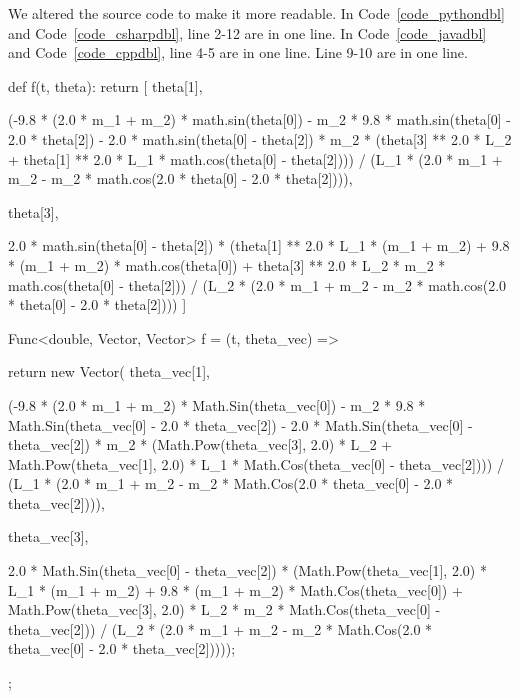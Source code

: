 We altered the source code to make it more readable. In Code~\ref{code_pythondbl} and Code~\ref{code_csharpdbl}, line 2-12 are in one line. In Code~\ref{code_javadbl} and Code~\ref{code_cppdbl}, line 4-5 are in one line. Line 9-10 are in one line.
\begin{listing}[ht]
\begin{python1}
def f(t, theta):
	return [
		theta[1],

		(-9.8 * (2.0 * m_1 + m_2) * math.sin(theta[0]) - m_2 * 9.8 * math.sin(theta[0] - 2.0 * theta[2]) - 2.0 * math.sin(theta[0] - theta[2]) * m_2 * (theta[3] ** 2.0 * L_2 + theta[1] ** 2.0 * L_1 * math.cos(theta[0] - theta[2]))) 
			/ (L_1 * (2.0 * m_1 + m_2 - m_2 * math.cos(2.0 * theta[0] - 2.0 * theta[2]))), 
		
		theta[3], 
		
		2.0 * math.sin(theta[0] - theta[2]) * (theta[1] ** 2.0 * L_1 * (m_1 + m_2) + 9.8 * (m_1 + m_2) * math.cos(theta[0]) + theta[3] ** 2.0 * L_2 * m_2 * math.cos(theta[0] - theta[2])) 
			/ (L_2 * (2.0 * m_1 + m_2 - m_2 * math.cos(2.0 * theta[0] - 2.0 * theta[2])))
		]
\end{python1}
\label{code_pythondbl}
\end{listing} 

\begin{listing}[ht]
\begin{csharp1}
Func<double, Vector, Vector> f = (t, theta_vec) => {
	return new Vector(
		theta_vec[1], 

		(-9.8 * (2.0 * m_1 + m_2) * Math.Sin(theta_vec[0]) - m_2 * 9.8 * Math.Sin(theta_vec[0] - 2.0 * theta_vec[2]) - 2.0 * Math.Sin(theta_vec[0] - theta_vec[2]) * m_2 * (Math.Pow(theta_vec[3], 2.0) * L_2 + Math.Pow(theta_vec[1], 2.0) * L_1 * Math.Cos(theta_vec[0] - theta_vec[2]))) 
			/ (L_1 * (2.0 * m_1 + m_2 - m_2 * Math.Cos(2.0 * theta_vec[0] - 2.0 * theta_vec[2]))), 
		
		theta_vec[3], 

		2.0 * Math.Sin(theta_vec[0] - theta_vec[2]) * (Math.Pow(theta_vec[1], 2.0) * L_1 * (m_1 + m_2) + 9.8 * (m_1 + m_2) * Math.Cos(theta_vec[0]) + Math.Pow(theta_vec[3], 2.0) * L_2 * m_2 * Math.Cos(theta_vec[0] - theta_vec[2])) 
			/ (L_2 * (2.0 * m_1 + m_2 - m_2 * Math.Cos(2.0 * theta_vec[0] - 2.0 * theta_vec[2]))));
};
\end{csharp1}
\label{code_csharpdbl}
\end{listing} 

